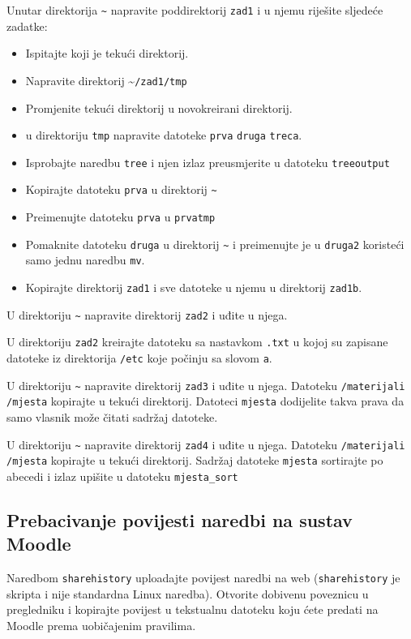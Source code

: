 \begin{zadatak} Unutar direktorija \texttt{\textasciitilde} napravite poddirektorij \texttt{zad1} i u njemu riješite sljedeće zadatke:
	\begin{itemize}
		\item Ispitajte koji je tekući direktorij.
		\item Napravite direktorij \textasciitilde \texttt{/zad1/tmp}
		\item Promjenite tekući direktorij u novokreirani direktorij.
		\item u direktoriju \texttt{tmp} napravite datoteke \texttt{prva} \texttt{druga} \texttt{treca}.
		\item Isprobajte naredbu \texttt{tree} i njen izlaz preusmjerite u datoteku \texttt{treeoutput}
		\item Kopirajte datoteku \texttt{prva} u direktorij  \texttt{\textasciitilde}
		\item Preimenujte datoteku \texttt{prva} u \texttt{prvatmp}
		\item Pomaknite datoteku \texttt{druga} u direktorij  \texttt{\textasciitilde} i preimenujte je u \texttt{druga2} koristeći samo jednu naredbu \texttt{mv}.
		\item Kopirajte direktorij \texttt{zad1} i sve datoteke u njemu u direktorij \texttt{zad1b}.
	\end{itemize}
\end{zadatak}


\begin{zadatak} 
	U direktoriju \texttt{\textasciitilde} napravite direktorij \texttt{zad2} i uđite u njega.
		\item U direktoriju \texttt{zad2} kreirajte datoteku sa nastavkom \texttt{.txt} u kojoj su zapisane datoteke iz direktorija \texttt{/etc} koje počinju sa slovom \texttt{a}.
		
\end{zadatak}

\begin{zadatak}
	U direktoriju \texttt{\textasciitilde} napravite direktorij \texttt{zad3}  i uđite u njega. Datoteku \texttt{/materijali /mjesta} kopirajte u tekući direktorij. Datoteci \texttt{mjesta} dodijelite takva prava da samo vlasnik može čitati sadržaj datoteke.
\end{zadatak}

\begin{zadatak}
	U direktoriju \texttt{\textasciitilde} napravite direktorij \texttt{zad4} i uđite u njega. Datoteku \texttt{/materijali /mjesta} kopirajte u tekući direktorij. Sadržaj datoteke \texttt{mjesta} sortirajte po abecedi i izlaz upišite u datoteku \texttt{mjesta\_sort} 
\end{zadatak}

\subsection*{Prebacivanje povijesti naredbi na sustav Moodle}

Naredbom \texttt{sharehistory} uploadajte povijest naredbi na web (\texttt{sharehistory} je skripta i nije standardna Linux naredba). Otvorite dobivenu poveznicu u pregledniku i kopirajte povijest u tekstualnu datoteku koju ćete predati na Moodle prema uobičajenim pravilima.
